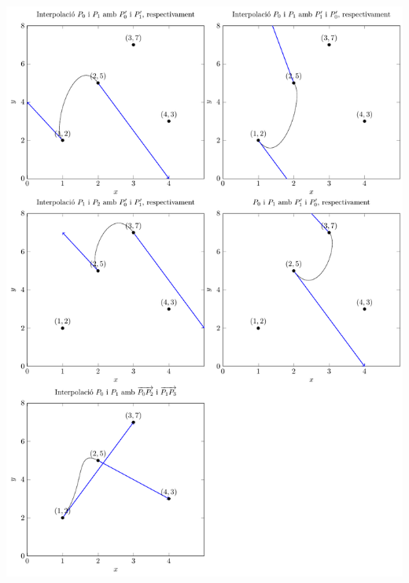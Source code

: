 \begin{enumerate}
\begin{minipage}[t]{\linewidth}
  \vspace{-2ex}
  \includegraphics[width=\textwidth]{../figures/interpolaciohermite.pdf}
  \label{fig:interpolaciohermite}
\end{minipage}


\end{enumerate}
